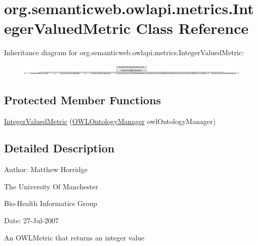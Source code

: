 \hypertarget{classorg_1_1semanticweb_1_1owlapi_1_1metrics_1_1_integer_valued_metric}{\section{org.\-semanticweb.\-owlapi.\-metrics.\-Integer\-Valued\-Metric Class Reference}
\label{classorg_1_1semanticweb_1_1owlapi_1_1metrics_1_1_integer_valued_metric}
}
Inheritance diagram for org.\-semanticweb.\-owlapi.\-metrics.\-Integer\-Valued\-Metric\-:\begin{figure}[H]
\begin{center}
\leavevmode
\includegraphics[height=0.550459cm]{classorg_1_1semanticweb_1_1owlapi_1_1metrics_1_1_integer_valued_metric}
\end{center}
\end{figure}
\subsection*{Protected Member Functions}
\begin{DoxyCompactItemize}
\item 
\hyperlink{classorg_1_1semanticweb_1_1owlapi_1_1metrics_1_1_integer_valued_metric_ae6afa4f3cd59d4f5cdc8e4c59f4504d6}{Integer\-Valued\-Metric} (\hyperlink{interfaceorg_1_1semanticweb_1_1owlapi_1_1model_1_1_o_w_l_ontology_manager}{O\-W\-L\-Ontology\-Manager} owl\-Ontology\-Manager)
\end{DoxyCompactItemize}


\subsection{Detailed Description}
Author\-: Matthew Horridge\par
 The University Of Manchester\par
 Bio-\/\-Health Informatics Group\par
 Date\-: 27-\/\-Jul-\/2007\par
\par


An {\ttfamily O\-W\-L\-Metric} that returns an integer value 

